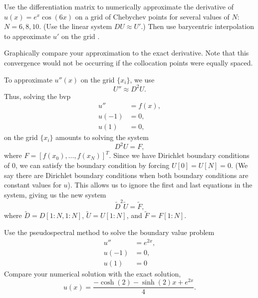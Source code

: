 \begin{problem}
Use the differentiation matrix to numerically approximate the derivative of $u(x) = e^{x}\cos(6x)$ on a grid of Chebychev points for several values of $N:$ $N=6, 8, 10.$  (Use the linear system $D U \approx U'$.)
Then use barycentric interpolation to approximate $u'$ on the grid .

Graphically compare your approximation to the exact derivative. Note that this convergence would not be occurring if the collocation points were equally spaced. 
\end{problem}

To approximate $u''(x)$ on the grid $\{x_i\}$, we use 
\[U'' \approx D^2 U.\]
Thus, solving the bvp
\begin{align*}
u'' &= f(x), \\
u(-1) &= 0, \\
u(1) &= 0,
\end{align*}
on the grid $\{x_i\}$ amounts to solving the system 
\[D^2 U = F,\]
where $F = [f(x_0),\ldots, f(x_N)]^T$.
Since we have Dirichlet boundary conditions of $0$, we can satisfy the boundary condition by forcing $U[0] = U[N] = 0$.
(We say there are Dirichlet boundary conditions when both boundary conditions are constant values for $u$).
This allows us to ignore the first and last equations in the system, giving us the new system 
\[\tilde{D}^2 \tilde{U} = \tilde{F},\]
where $\tilde{D} = D[1:N,1:N]$, $\tilde{U} = U[1:N]$, and $\tilde{F} = F[1:N]$.

\begin{problem}
Use the pseudospectral method to solve the boundary value problem 
\begin{align*}
u'' &= e^{2x}, \\
u(-1) &= 0, \\
u(1) &= 0
\end{align*}
Compare your numerical solution with the exact solution, 
\[
u(x) = \frac{- \cosh(2) - \sinh(2)x + e^{2x}}{4}.
\]
\end{problem}



